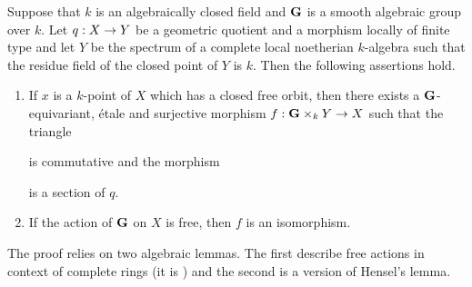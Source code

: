\begin{theorem}\label{theorem:free_actions_over_complete_local_rings_are_trivial_bundles}
Suppose that $k$ is an algebraically closed field and $\mathbf{G}$ is a smooth algebraic group over $k$. Let $q:X\rightarrow Y$ be a geometric quotient and a morphism locally of finite type and let $Y$ be the spectrum of a complete local noetherian $k$-algebra such that the residue field of the closed point of $Y$ is $k$. Then the following assertions hold.
\begin{enumerate}[label=\emph{\textbf{(\arabic*)}}, leftmargin=3.0em]
\item If $x$ is a $k$-point of $X$ which has a closed free orbit, then there exists a $\mathbf{G}$-equivariant, {\'e}tale and surjective morphism $f:\mathbf{G}\times_k Y \rightarrow X$ such that the triangle
\begin{center}
\end{center}
is commutative and the morphism
\begin{center}
\end{center}
is a section of $q$.
\item If the action of $\mathbf{G}$ on $X$ is free, then $f$ is an isomorphism.
\end{enumerate}
\end{theorem}
\noindent
The proof relies on two algebraic lemmas. The first describe free actions in context of complete rings (it is {\cite[lemma on page 18]{mumford1994geometric}}) and the second is a version of Hensel's lemma.


